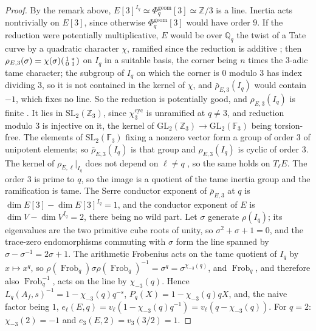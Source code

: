 \documentclass[11pt]{amsart}
\theoremstyle{definition}
\newcommand{\Q}{\mathbb{Q}}
\newcommand{\Z}{\mathbb{Z}}
\newcommand{\F}{\mathbb{F}}
\newcommand{\Phig}{\Phi^{\mathrm{geom}}}
\newcommand{\Frob}{\operatorname{Frob}}
\newcommand{\cyc}{\mathrm{cyc}}
\newcommand{\SL}{\mathrm{SL}}
\newcommand{\GL}{\mathrm{GL}}
\begin{document}
\begin{proof}
By the remark above, $E[3]^{I_q}\simeq\Phig_q[3]\simeq\Z/3$ is a line. Inertia acts nontrivially on $E[3]$, since otherwise $\Phig_q[3]$ would have order $9$. If the reduction were potentially multiplicative, $E$ would be over $\Q_q$ the twist of a Tate curve by a quadratic character $\chi$, ramified since the reduction is additive \cite[V.5]{SilvermanATAEC}; then $\rho_{E,3}(\sigma)=\chi(\sigma)\begin{psmallmatrix}1&*\\0&1\end{psmallmatrix}$ on $I_q$ in a suitable basis, the corner being $n$ times the $3$-adic tame character; the subgroup of $I_q$ on which the corner is $0$ modulo $3$ has index dividing $3$, so it is not contained in the kernel of $\chi$, and $\bar\rho_{E,3}(I_q)$ would contain $-1$, which fixes no line. So the reduction is potentially good, and $\rho_{E,3}(I_q)$ is finite \cite[\S2, Theorem 2(i)]{SerreTate68}. It lies in $\SL_2(\Z_3)$, since $\chi_3^{\cyc}$ is unramified at $q\ne3$, and reduction modulo $3$ is injective on it, the kernel of $\GL_2(\Z_3)\to\GL_2(\F_3)$ being torsion-free. The elements of $\SL_2(\F_3)$ fixing a nonzero vector form a group of order $3$ of unipotent elements; so $\bar\rho_{E,3}(I_q)$ is that group and $\rho_{E,3}(I_q)$ is cyclic of order $3$. The kernel of $\rho_{E,\ell}|_{I_q}$ does not depend on $\ell\ne q$ \cite[\S2, Theorem 2(ii)]{SerreTate68}, so the same holds on $T_\ell E$. The order $3$ is prime to $q$, so the image is a quotient of the tame inertia group and the ramification is tame. The Serre conductor exponent of $\bar\rho_{E,3}$ at $q$ is $\dim E[3]-\dim E[3]^{I_q}=1$, and the conductor exponent of $E$ is $\dim V-\dim V^{I_q}=2$, there being no wild part. Let $\sigma$ generate $\rho(I_q)$; its eigenvalues are the two primitive cube roots of unity, so $\sigma^2+\sigma+1=0$, and the trace-zero endomorphisms commuting with $\sigma$ form the line spanned by $\sigma-\sigma^{-1}=2\sigma+1$. The arithmetic Frobenius acts on the tame quotient of $I_q$ by $x\mapsto x^q$, so $\rho(\Frob_q)\sigma\rho(\Frob_q)^{-1}=\sigma^q=\sigma^{\chi_{-3}(q)}$, and $\Frob_q$, and therefore also $\Frob_q^{-1}$, acts on the line by $\chi_{-3}(q)$. Hence $L_q(A_f,s)^{-1}=1-\chi_{-3}(q)q^{-s}$, $P_q(X)=1-\chi_{-3}(q)qX$, and, the naive factor being $1$, $e_\ell(E,q)=v_\ell(1-\chi_{-3}(q)q^{-1})=v_\ell(q-\chi_{-3}(q))$. For $q=2$: $\chi_{-3}(2)=-1$ and $e_3(E,2)=v_3(3/2)=1$.
\end{proof}
\end{document}
